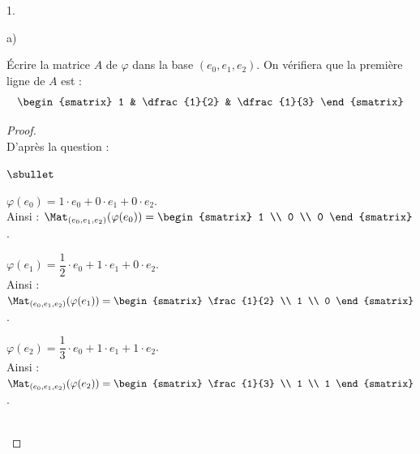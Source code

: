 \documentclass[11pt]{article}%
\begin{document}
\begin{noliste}{1.}
  
  \newpage
  
  
\item
  \begin{noliste}{a)}
    \setlength{\itemsep}{2mm}
  \item Écrire la matrice $A$ de $\varphi$ dans la base
    $(e_{0},e_{1},e_{2})$. On vérifiera que la première ligne de $A$
    est :
    \[
    \begin{smatrix}
      1 & \dfrac{1}{2} & \dfrac{1}{3}
    \end{smatrix}
    \]

    \begin{proof}~\\%
      D'après la question  :
      \begin{noliste}{$\sbullet$}
      \item $\varphi(e_0) = 1 \cdot e_0 + 0 \cdot e_1 + 0 \cdot e_2$.\\
        Ainsi : $\Mat_{(e_0, e_1, e_2)}(\varphi(e_0)) =
        \begin{smatrix}
          1 \\
          0 \\
          0
        \end{smatrix}
        $.

      \item $\varphi(e_1) = \dfrac{1}{2} \cdot e_0 + 1 \cdot e_1 + 0
        \cdot e_2$.\\ 
        Ainsi : $\Mat_{(e_0, e_1, e_2)}(\varphi(e_1)) =
        \begin{smatrix}
          \frac{1}{2} \\
          1 \\
          0
        \end{smatrix}
        $.

      \item $\varphi(e_2) = \dfrac{1}{3} \cdot e_0 + 1 \cdot e_1 + 1
        \cdot e_2$.\\ 
        Ainsi : $\Mat_{(e_0, e_1, e_2)}(\varphi(e_2)) =
        \begin{smatrix}
          \frac{1}{3} \\
          1 \\
          1
        \end{smatrix}
        $.        
      \end{noliste}
      ~\\[-1cm]
    \end{proof}


\end{noliste}
\end{noliste}
\end{document}
